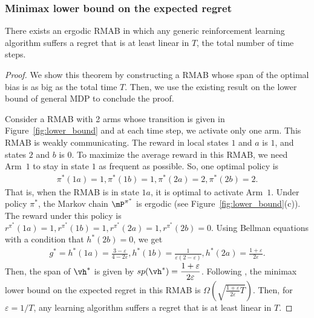 \subsubsection{Minimax lower bound on the expected regret}

\begin{thm}
    There exists an ergodic RMAB in which any generic reinforcement learning algorithm suffers a regret that is at least linear in $T$, the total number of time steps.
\end{thm}
\begin{proof}
    We show this theorem by constructing a RMAB whose span of the optimal bias is as big as the total time $T$.
    Then, we use the existing result on the lower bound of general MDP to conclude the proof.

    Consider a RMAB with 2 arms whose transition is given in Figure~\ref{fig:lower_bound} and at each time step, we activate only one arm.
    This RMAB is weakly communicating.
    The reward in local states $1$ and $a$ is $1$, and states $2$ and $b$ is $0$.
    To maximize the average reward in this RMAB, we need Arm~$1$ to stay in state $1$ as frequent as possible.
    So, one optimal policy is
    \begin{align*}
        \pi^*(1a)=1, \pi^*(1b)=1, \pi^*(2a)=2, \pi^*(2b)=2.
    \end{align*}
    That is, when the RMAB is in state $1a$, it is optimal to activate Arm~$1$.
    Under policy $\pi^*$, the Markov chain $\mP^{\pi^*}$ is ergodic (see Figure~\ref{fig:lower_bound}(c)).
    The reward under this policy is $r^{\pi^*}(1a)=1, r^{\pi^*}(1b)=1, r^{\pi^*}(2a)=1, r^{\pi^*}(2b)=0$.
    Using Bellman equations with a condition that $h^*(2b)=0$, we get
    \begin{align*}
        g^*=h^*(1a)=\frac{3-\varepsilon}{4-2\varepsilon}, h^*(1b)=\frac1{\varepsilon(2-\varepsilon)},
        h^*(2a)=\frac{1+\varepsilon}{2\varepsilon}.
    \end{align*}
    Then, the span of $\vh^*$ is given by $sp(\vh^*)=\displaystyle\frac{1+\varepsilon}{2\varepsilon}$.
    Following \cite{jaksch2010near, zhang2019regret}, the minimax lower bound on the expected regret in this RMAB is $\displaystyle\Omega\left(\sqrt{\frac{1+\varepsilon}{2\varepsilon}T}\right)$.
    Then, for $\varepsilon=1/T$, any learning algorithm suffers a regret that is at least linear in $T$.
    

\end{proof}
